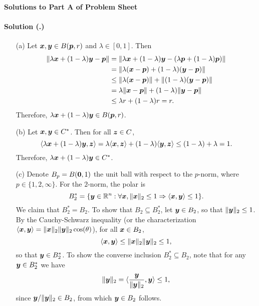 \documentclass{article}
\newcounter{problemSheetNumber}
\newcounter{problems}
\renewcommand{\solution}[1]{\paragraph{Solution (\theproblemSheetNumber.\theproblems)}\addtocounter{problems}{1}\label{#1}}
\begin{document}
 
\begin{center}
{\Large {\bf Solutions to Part A of Problem Sheet \theproblemSheetNumber}}
\end{center}

\solution{pr:4} 
\begin{itemize}
 \item[(a)] Let $\bm{x},\bm{y}\in B(\bm{p},r)$ and $\lambda\in [0,1]$. Then
 \begin{align*}
  \Vert {\lambda \bm{x}+(1-\lambda)\bm{y}-\bm{p}}\Vert &= \Vert {\lambda \bm{x}+(1-\lambda)\bm{y}-(\lambda \bm{p}+(1-\lambda)\bm{p})}\Vert\\
  &= \Vert {\lambda (\bm{x}-\bm{p})+(1-\lambda)(\bm{y}-\bm{p})}\Vert\\
  &\leq \Vert {\lambda (\bm{x}-\bm{p})}\Vert+\Vert {(1-\lambda)(\bm{y}-\bm{p})}\Vert\\
  &=\lambda\Vert {\bm{x}-\bm{p}}\Vert+(1-\lambda)\Vert {\bm{y}-\bm{p}}\Vert\\
  &\leq \lambda r+(1-\lambda)r = r.
 \end{align*}
Therefore, $\lambda \bm{x}+(1-\lambda)\bm{y}\in B(\bm{p},r)$.
\item[(b)] Let $\bm{x},\bm{y}\in C^*$. Then for all $\bm{z}\in C$,
\begin{equation*}
 \langle {\lambda \bm{x}+(1-\lambda)\bm{y}}, {\bm{z}} \rangle = \lambda\langle { \bm{x}}, {\bm{z}} \rangle+(1-\lambda)\langle {\bm{y}}, {\bm{z}} \rangle\leq (1-\lambda)+\lambda = 1.
\end{equation*}
Therefore, $\lambda \bm{x}+(1-\lambda)\bm{y}\in C^*$.
\item[(c)] Denote $B_p=B(\bm{0},1)$ the unit ball with respect to the $p$-norm, where $p\in \{1,2,\infty\}$. For the $2$-norm, the polar is
\begin{equation*}
 B_2^* = \{\bm{y}\in \mathbb{R}^n \mathrel{\mathop{:}} \forall \bm{x}, \Vert {\bm{x}}\Vert_2\leq 1\Rightarrow \langle {\bm{x}}, {\bm{y}} \rangle\leq 1\}.
\end{equation*}
We claim that $B_2^* = B_2$. To show that $B_2\subseteq B_2^*$, let $\bm{y}\in B_2$, so that $\Vert {\bm{y}}\Vert_2\leq 1$. 
By the Cauchy-Schwarz inequality (or the characterization $\langle {\bm{x}}, {\bm{y}} \rangle=\Vert {\bm{x}}\Vert_2\Vert {\bm{y}}\Vert_2\cos(\theta)$), for all $\bm{x}\in B_2$, 
\begin{equation*}
 \langle {\bm{x}}, {\bm{y}} \rangle\leq \Vert {\bm{x}}\Vert_2\Vert {\bm{y}}\Vert_2\leq 1,
\end{equation*}
so that $\bm{y}\in B_2^*$. To show the converse inclusion $B_2^*\subseteq B_2$, note that for any $\bm{y}\in B_2^*$ we have
\begin{equation*}
 \Vert {\bm{y}}\Vert_2 = \langle {\frac{\bm{y}}{\Vert {\bm{y}}\Vert_2}}, {\bm{y}} \rangle\leq 1,
\end{equation*}
since $\bm{y}/\Vert {\bm{y}}\Vert_2\in B_2$, from which $\bm{y}\in B_2$ follows. 


\end{itemize}
\end{document}
